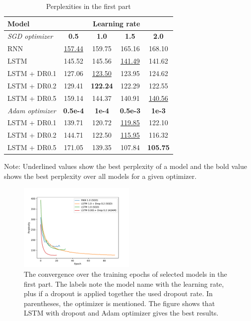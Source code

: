 \documentclass[a4paper]{article}
\begin{document}
\begin{table}
  \caption{Perplexities in the first part}
  \label{tab:dataPart1}
  \begin{tabular}{l|c c c c}
    \toprule
    \textbf{Model} & \multicolumn{4}{c}{\textbf{Learning rate} } \\
    \midrule
    \textit{SGD optimizer} & \textbf{0.5}	& \textbf{1.0} & \textbf{1.5} & \textbf{2.0} \\
    \midrule
    RNN & \underline{157.44} & 159.75 & 165.16 & 168.10\\
    LSTM & 145.52 & 145.56 & \underline{141.49} & 141.62 \\
    LSTM + DR0.1 & 127.06 & \underline{123.50} & 123.95 & 124.62 \\
    LSTM + DR0.2 & 129.41 & \textbf{122.24} & 122.29 & 122.55 \\
    LSTM + DR0.5 & 159.14 & 144.37 & 140.91 & \underline{140.56} \\  
    \toprule
    \textit{Adam optimizer} & \textbf{0.5e-4} & \textbf{1e-4} & \textbf{0.5e-3} & \textbf{1e-3} \\
    \midrule
    LSTM + DR0.1 & 139.71 & 120.72 & \underline{119.85} & 122.10 \\
    LSTM + DR0.2 & 144.71 & 122.50 & \underline{115.95} & 116.32 \\
    LSTM + DR0.5 & 171.05 & 139.35 & 107.84 & \textbf{105.75} \\
    \bottomrule
  \end{tabular}
  \begin{minipage}{7.5cm}
    \vspace{0.1cm}
    Note: Underlined values show the best perplexity of a model and the bold value shows the best perplexity over all models for a given optimizer. 
  \end{minipage}
\end{table}

\begin{figure}[htbp]
  \centering
  \includegraphics[width=0.5\textwidth]{part1_convergence.pdf}
  \caption{The convergence over the training epochs of selected models in the first part. The labels note the model name with the learning rate, plus if a dropout is applied together the used dropout rate. In parentheses, the optimizer is mentioned. The figure shows that LSTM with dropout and Adam optimizer gives the best results.}
  \label{fig:part_1_convergence}  
\end{figure}
\end{document}
